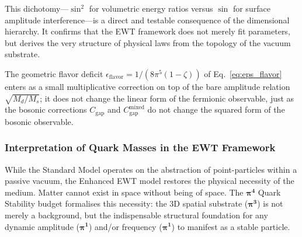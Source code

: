 \documentclass[10pt,a4paper]{article}
\begin{document}
This dichotomy---\(\sin^2\) for volumetric energy ratios versus \(\sin\) for surface amplitude interference---is a direct and testable consequence of the dimensional hierarchy. It confirms that the EWT framework does not merely fit parameters, but derives the very structure of physical laws from the topology of the vacuum substrate. 

The geometric flavor deficit $\epsilon_{\text{flavor}} = 1/(8\pi^5(1-\zeta))$
of Eq.~\eqref{eq:eps_flavor} enters as a small multiplicative correction
on top of the bare amplitude relation $\sqrt{M_d/M_s}$; it does not
change the linear form of the fermionic observable, just as the
bosonic corrections $C_{\text{gap}}$ and $C_{\text{gap}}^{\text{mixed}}$
do not change the squared form of the bosonic observable.

\subsubsection{Interpretation of Quark Masses in the EWT Framework}
\label{subsec:quark-mass-interpretation}

While the Standard Model operates on the abstraction of point-particles within a passive vacuum, the Enhanced EWT model restores the physical necessity of the medium. Matter cannot exist in space without being of space. The \(\bm{\pi^4}\) Quark Stability budget formalises this necessity: the 3D spatial substrate (\(\bm{\pi^3}\)) is not merely a background, but the indispensable structural foundation for any dynamic amplitude (\(\bm{\pi^1}\)) and/or frequency (\(\bm{\pi^1}\)) to manifest as a stable particle.

\noindent
\begin{center}
\end{center}
\vspace{1em}
\end{document}
